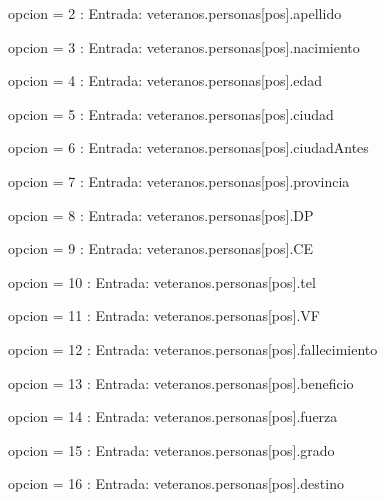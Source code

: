 \documentclass{article}
\begin{document}
                    \hspace{20mm}opcion = 2 : Entrada: veteranos.personas[pos].apellido
                    
                    \hspace{20mm}opcion = 3 : Entrada: veteranos.personas[pos].nacimiento
                    
                    \hspace{20mm}opcion = 4 : Entrada: veteranos.personas[pos].edad
                    
                    \hspace{20mm}opcion = 5 : Entrada: veteranos.personas[pos].ciudad
                    
                    \hspace{20mm}opcion = 6 : Entrada: veteranos.personas[pos].ciudadAntes

                    \hspace{20mm}opcion = 7 : Entrada: veteranos.personas[pos].provincia

                    \hspace{20mm}opcion = 8 : Entrada: veteranos.personas[pos].DP
                    
                    \hspace{20mm}opcion = 9 : Entrada: veteranos.personas[pos].CE
                    
                    \hspace{20mm}opcion = 10 : Entrada: veteranos.personas[pos].tel
                    
                    \hspace{20mm}opcion = 11 : Entrada: veteranos.personas[pos].VF
                    
                    \hspace{20mm}opcion = 12 : Entrada: veteranos.personas[pos].fallecimiento

                    \hspace{20mm}opcion = 13 : Entrada: veteranos.personas[pos].beneficio

                    \hspace{20mm}opcion = 14 : Entrada: veteranos.personas[pos].fuerza

                    \hspace{20mm}opcion = 15 : Entrada: veteranos.personas[pos].grado

                    \hspace{20mm}opcion = 16 : Entrada: veteranos.personas[pos].destino
\end{document}
